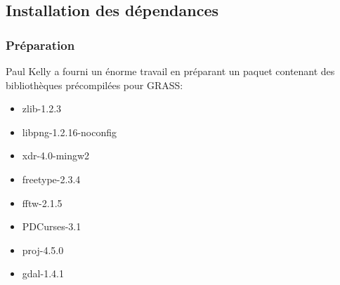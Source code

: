 % 
% 
% 
% 
% 
% 

\subsection{Installation des dépendances}
\subsubsection{Préparation}
Paul Kelly a fourni un énorme travail en préparant un paquet contenant des bibliothèques précompilées pour GRASS:

\begin{itemize}
\item zlib-1.2.3
\item libpng-1.2.16-noconfig
\item xdr-4.0-mingw2
\item freetype-2.3.4
\item fftw-2.1.5
\item PDCurses-3.1
\item proj-4.5.0
\item gdal-1.4.1
\end{itemize}

